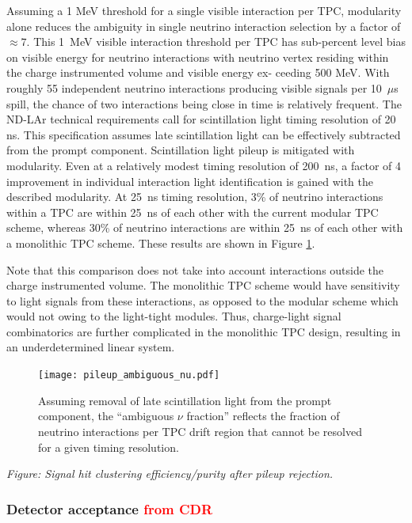 Assuming a 1 MeV threshold for a single visible interaction per TPC, modularity alone reduces the ambiguity in single neutrino interaction selection by a factor of $\approx7$. This 1~MeV visible interaction threshold per TPC has sub-percent level bias on visible energy for neutrino interactions with neutrino vertex residing within the charge instrumented volume and visible energy ex- ceeding 500 MeV.
With roughly 55 independent neutrino interactions producing visible signals per 10~$\mu$s spill, the chance of two interactions being close in time is relatively frequent. The ND-LAr technical requirements call for scintillation light timing resolution of 20 ns. This specification assumes late scintillation light can be effectively subtracted from the prompt component. Scintillation light pileup is mitigated with modularity. Even at a relatively modest timing resolution of 200~ns, a factor of 4 improvement in individual interaction light identification is gained with the described modularity. At 25~ns timing resolution, 3\% of neutrino interactions within a TPC are within 25~ns of each other with the current modular TPC scheme, whereas 30\% of neutrino interactions are within 25~ns of each other with a monolithic TPC scheme. These results are shown in Figure \ref{fig:ndlar-ana-pileup}.

Note that this comparison does not take into account interactions outside the charge instrumented volume. The monolithic TPC scheme would have sensitivity to light signals from these interactions, as opposed to the modular scheme which would not owing to the light-tight modules. Thus, charge-light signal combinatorics are further complicated in the monolithic TPC design, resulting in an underdetermined linear system.

\begin{figure}
\centering
\texttt{[image: pileup\_ambiguous\_nu.pdf]}
\caption{Assuming removal of late scintillation light from the prompt component, the ``ambiguous $\nu$ fraction'' reflects the fraction of neutrino interactions per TPC drift region that cannot be resolved for a given timing resolution.}
\label{fig:ndlar-ana-pileup}
\end{figure}

{\it Figure: Signal hit clustering efficiency/purity after pileup rejection.}

\subsubsection{Detector acceptance \textcolor{red}{from CDR}}

